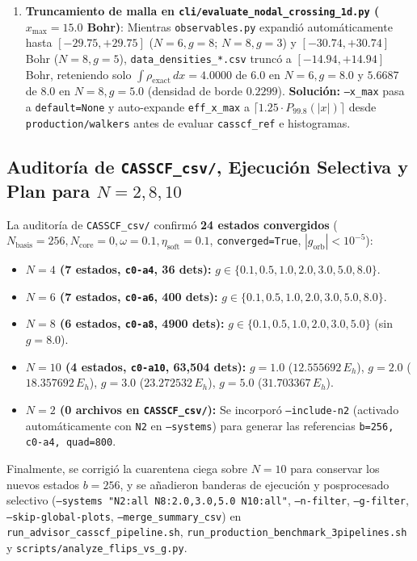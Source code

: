 \documentclass[10pt,a4paper]{article}
\begin{document}
\begin{enumerate}
\item \textbf{Truncamiento de malla en \texttt{cli/evaluate\_nodal\_crossing\_1d.py} ($x_{\max} = 15.0$ Bohr)}: Mientras \texttt{observables.py} expandió automáticamente hasta $[-29.75, +29.75]$ ($N=6, g=8$; $N=8, g=3$) y $[-30.74, +30.74]$ Bohr ($N=8, g=5$), \texttt{data\_densities\_*.csv} truncó a $[-14.94, +14.94]$ Bohr, reteniendo solo $\int \rho_{\mathrm{exact}}\,dx = 4.0000$ de $6.0$ en $N=6, g=8.0$ y $5.6687$ de $8.0$ en $N=8, g=5.0$ (densidad de borde $0.2299$). \textbf{Solución:} \texttt{--x\_max} pasa a \texttt{default=None} y auto-expande \texttt{eff\_x\_max} a $\lceil 1.25 \cdot P_{99.8}(|x|) \rceil$ desde \texttt{production/walkers} antes de evaluar \texttt{casscf\_ref} e histogramas.
\end{enumerate}

\subsection{Auditoría de \texttt{CASSCF\_csv/}, Ejecución Selectiva y Plan para $N=2, 8, 10$}

La auditoría de \texttt{CASSCF\_csv/} confirmó \textbf{24 estados convergidos} ($N_{\mathrm{basis}}=256, N_{\mathrm{core}}=0, \omega=0.1, \eta_{\mathrm{soft}}=0.1$, \texttt{converged=True}, $|g_{\mathrm{orb}}| < 10^{-5}$):
\begin{itemize}
\item \textbf{$N=4$ (7 estados, \texttt{c0-a4}, 36 dets):} $g \in \{0.1, 0.5, 1.0, 2.0, 3.0, 5.0, 8.0\}$.
\item \textbf{$N=6$ (7 estados, \texttt{c0-a6}, 400 dets):} $g \in \{0.1, 0.5, 1.0, 2.0, 3.0, 5.0, 8.0\}$.
\item \textbf{$N=8$ (6 estados, \texttt{c0-a8}, 4900 dets):} $g \in \{0.1, 0.5, 1.0, 2.0, 3.0, 5.0\}$ (sin $g=8.0$).
\item \textbf{$N=10$ (4 estados, \texttt{c0-a10}, 63,504 dets):} $g=1.0$ ($12.555692\,E_h$), $g=2.0$ ($18.357692\,E_h$), $g=3.0$ ($23.272532\,E_h$), $g=5.0$ ($31.703367\,E_h$).
\item \textbf{$N=2$ (0 archivos en \texttt{CASSCF\_csv/}):} Se incorporó \texttt{--include-n2} (activado automáticamente con \texttt{N2} en \texttt{--systems}) para generar las referencias \texttt{b=256, c0-a4, quad=800}.
\end{itemize}

Finalmente, se corrigió la cuarentena ciega sobre $N=10$ para conservar los nuevos estados $b=256$, y se añadieron banderas de ejecución y posprocesado selectivo (\texttt{--systems "N2:all N8:2.0,3.0,5.0 N10:all"}, \texttt{--n-filter}, \texttt{--g-filter}, \texttt{--skip-global-plots}, \texttt{--merge\_summary\_csv}) en \texttt{run\_advisor\_casscf\_pipeline.sh}, \texttt{run\_production\_benchmark\_3pipelines.sh} y \texttt{scripts/analyze\_flips\_vs\_g.py}.
\end{document}
